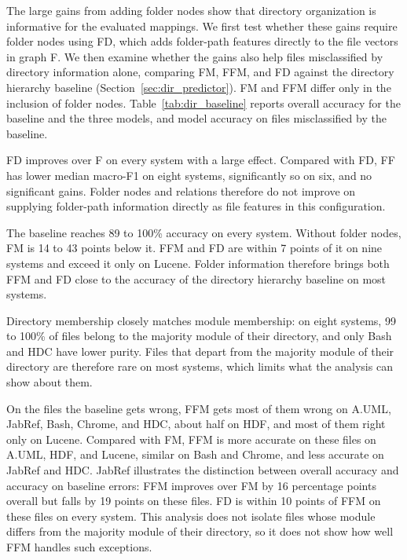 The large gains from adding folder nodes show that directory organization is informative for the evaluated mappings. We first test whether these gains require folder nodes using FD, which adds folder-path features directly to the \ft{} file vectors in graph F. We then examine whether the gains also help files misclassified by directory information alone, comparing FM, FFM, and FD against the directory hierarchy baseline (Section~\ref{sec:dir_predictor}). FM and FFM differ only in the inclusion of folder nodes. Table~\ref{tab:dir_baseline} reports overall accuracy for the baseline and the three models, and model accuracy on files misclassified by the baseline.

FD improves over F on every system with a large effect. Compared with FD, FF has lower median macro-F1 on eight systems, significantly so on six, and no significant gains. Folder nodes and relations therefore do not improve on supplying folder-path information directly as file features in this configuration.

The baseline reaches 89 to 100\% accuracy on every system. Without folder nodes, FM is 14 to 43 points below it. FFM and FD are within 7 points of it on nine systems and exceed it only on Lucene. Folder information therefore brings both FFM and FD close to the accuracy of the directory hierarchy baseline on most systems.

Directory membership closely matches module membership: on eight systems, 99 to 100\% of files belong to the majority module of their directory, and only Bash and HDC have lower purity. Files that depart from the majority module of their directory are therefore rare on most systems, which limits what the analysis can show about them.

On the files the baseline gets wrong, FFM gets most of them wrong on A.UML, JabRef, Bash, Chrome, and HDC, about half on HDF, and most of them right only on Lucene. Compared with FM, FFM is more accurate on these files on A.UML, HDF, and Lucene, similar on Bash and Chrome, and less accurate on JabRef and HDC. JabRef illustrates the distinction between overall accuracy and accuracy on baseline errors: FFM improves over FM by 16 percentage points overall but falls by 19 points on these files. FD is within 10 points of FFM on these files on every system. This analysis does not isolate files whose module differs from the majority module of their directory, so it does not show how well FFM handles such exceptions.


